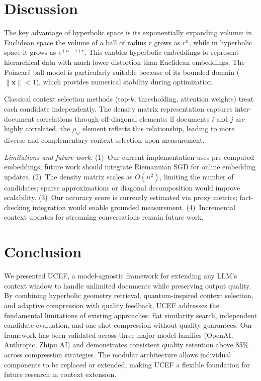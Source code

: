 \documentclass[journal]{IEEEtran}
\newcommand{\norm}[1]{\left\|#1\right\|}
\newcommand{\ucef}{\textsf{UCEF}}
\begin{document}
\section{Discussion}
\label{sec:discussion}

The key advantage of hyperbolic space is its exponentially expanding
volume: in Euclidean space the volume of a ball of radius $r$ grows as
$r^{n}$, while in hyperbolic space it grows as $e^{(n-1)r}$.  This enables
hyperbolic embeddings to represent hierarchical data with much lower
distortion than Euclidean embeddings.  The Poincar\'{e} ball model is
particularly suitable because of its bounded domain ($\norm{\mathbf{x}} <
1$), which provides numerical stability during optimization.

Classical context selection methods (top-$k$, thresholding, attention
weights) treat each candidate independently.  The density matrix
representation captures inter-document correlations through off-diagonal
elements: if documents $i$ and $j$ are highly correlated, the $\rho_{ij}$
element reflects this relationship, leading to more diverse and
complementary context selection upon measurement.

\emph{Limitations and future work.}
(1)~Our current implementation uses pre-computed embeddings; future work
should integrate Riemannian SGD for online embedding updates.
(2)~The density matrix scales as $O(n^{2})$, limiting the number of
candidates; sparse approximations or diagonal decomposition would improve
scalability.
(3)~Our accuracy score is currently estimated via proxy metrics;
fact-checking integration would enable grounded measurement.
(4)~Incremental context updates for streaming conversations remain future
work.


\section{Conclusion}
\label{sec:conclusion}

We presented \ucef{}, a model-agnostic framework for extending any LLM's
context window to handle unlimited documents while preserving output quality.
By combining hyperbolic geometry retrieval, quantum-inspired context
selection, and adaptive compression with quality feedback, \ucef{} addresses
the fundamental limitations of existing approaches: flat similarity search,
independent candidate evaluation, and one-shot compression without quality
guarantees.  Our framework has been validated across three major model
families (OpenAI, Anthropic, Zhipu AI) and demonstrates consistent quality
retention above 85\% across compression strategies.  The modular
architecture allows individual components to be replaced or extended, making
\ucef{} a flexible foundation for future research in context extension.
\end{document}

